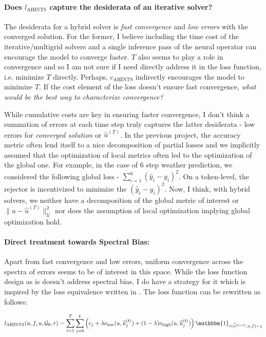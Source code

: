 \documentclass[12pt]{article}
\begin{document}
\paragraph{Does $l_{\text{AHINTS}}$ capture the desiderata of an iterative solver?} The desiderata for a hybrid solver is 
\textit{fast convergence} and \textit{low errors} with the converged solution. For the former, I believe including the time cost of the iterative/multigrid solvers and a single inference pass of the neural operator can encourage the model to converge faster. $T$ also seems to play a role in convergence and so I am not sure if I need directly address it in the loss function, i.e. minimize $T$ directly. Perhaps, $c_{\text{AHINTS}}$ indirectly encourages the model to minimize $T$. If the cost element of the loss doesn't ensure fast convergence,  \textit{what would be the best way to characterize convergence?}

While cumulative costs are key in ensuring faster convergence, I don't think a summation of errors at each time step truly captures the latter desiderata - low errors for \textit{converged solution} or $\widehat{u}^{(T)}$. In the previous project, the accuracy metric often lend itself to a nice decomposition of partial losses and we implicitly assumed that the optimization of local metrics often led to the optimization of the global one. For example, in the case of $6$ step weather prediction, we considered the following global loss - $\sum_{i = 1}^6 (\widehat{y}_i - y_i)^2$. On a token-level, the rejector is incentivized to minimize the $(\widehat{y}_i - y_i)^2$. Now, I think, with hybrid solvers, we neither have a decomposition of the global metric of interest or $\|u - \widehat{u}^{(T)}\|_{\mathcal{U}}^2$ nor does the assumption of local optimization implying global optimization hold. 

\paragraph{Direct treatment towards Spectral Bias:} Apart from fast convergence and low errors, uniform convergence across the spectra of errors seems to be of interest in this space. While the loss function design as is doesn't address spectral bias, I do have a strategy for it which is inspired by the loss equivalence written in . The loss function can be rewritten as follows:

\begin{align*}
    l_{\text{AHINTS}}(a, f, u, \mathcal{G}_{\theta}, r) = \sum_{t = 1}^{T} \sum_{j = 0}^L \left(c_j +  \lambda e_{\text{low}}(u, \widehat{u}^{(t)}_j) + (1 - \lambda)e_{\text{high}}(u, \widehat{u}^{(t)}_j)\right)\mathbbm{1}_{r(\widehat{u}^{(t - 1)}, a, f)  = j}
\end{align*}
\end{document}
